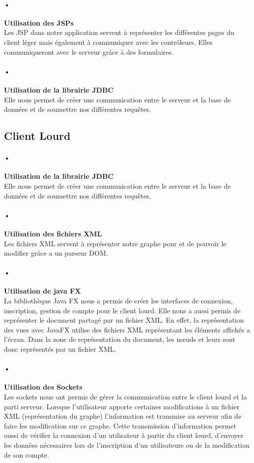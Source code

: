 \documentclass[11pt,a4paper]{article}
\begin{document}
\paragraph{•}
\textbf{Utilisation des JSPs}\\
Les JSP dans notre application servent à représenter les différentes pages du client léger mais également à communiquer avec les contrôleurs. Elles communiqueront avec le serveur grâce à des formulaires.

\paragraph{•}
\textbf{Utilisation de la librairie JDBC}\\
Elle nous permet de créer une communication entre le serveur et la base de données et de soumettre nos différentes requêtes.

\subsection{Client Lourd}
\paragraph{•}
\textbf{Utilisation de la librairie JDBC}\\
Elle nous permet de créer une communication entre le serveur et la base de données et de soumettre nos différentes requêtes.
\paragraph{•}
\textbf{Utilisation des fichiers XML}\\
Les fichiers XML servent à représenter notre graphe pour et de pouvoir
le modifier grâce a un parseur DOM.

\paragraph{•}
\textbf{Utilisation de java FX}\\
La bibliothèque Java FX nous a permis de créer les interfaces de
connexion, inscription, gestion de compte pour le client lourd. Elle
nous a aussi permis de représenter le document partagé par un fichier
XML. En effet, la représentation des vues avec JavaFX utilise des
fichiers XML représentant les éléments affichés a l'écran. Dans la
zone de représentation du document, les nœuds et leurs sont donc représentés
par un fichier XML.
\paragraph{•}
\textbf{Utilisation des Sockets}\\
Les sockets nous ont permis de gérer la communication entre le client
lourd et la parti serveur. Lorsque l'utilisateur apporte certaines
modifications à un fichier XML (représentation du graphe)
l'information est transmise au serveur afin de faire les modification
sur ce graphe. Cette transmission d'information permet aussi de
vérifier la connexion d'un utilisateur à partir du client lourd,
d'envoyer les données nécessaires lors de l'inscription d'un
utilisateurs ou de la modification de son compte.
\end{document}
